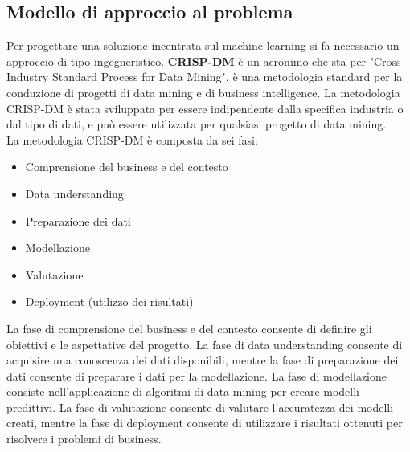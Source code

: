 \documentclass{article}
\begin{document}
    \subsection{Modello di approccio al problema}
    Per progettare una soluzione incentrata sul machine learning si fa necessario un approccio di tipo ingegneristico.\newline
    \textbf{CRISP-DM} è un acronimo che sta per "Cross Industry Standard Process for Data Mining", è una metodologia standard per la conduzione di progetti di data mining e di business intelligence. La metodologia CRISP-DM è stata sviluppata per essere indipendente dalla specifica industria o dal tipo di dati, e può essere utilizzata per qualsiasi progetto di data mining.\\

    La metodologia CRISP-DM è composta da sei fasi:

        \begin{itemize}
            \item Comprensione del business e del contesto
            \item Data understanding
            \item Preparazione dei dati
            \item Modellazione
            \item Valutazione
            \item Deployment (utilizzo dei risultati)
        \end{itemize}   
    \newline
    La fase di comprensione del business e del contesto consente di definire gli obiettivi e le aspettative del progetto. La fase di data understanding consente di acquisire una conoscenza dei dati disponibili, mentre la fase di preparazione dei dati consente di preparare i dati per la modellazione. La fase di modellazione consiste nell'applicazione di algoritmi di data mining per creare modelli predittivi. La fase di valutazione consente di valutare l'accuratezza dei modelli creati, mentre la fase di deployment consente di utilizzare i risultati ottenuti per risolvere i problemi di business.
\end{document}
